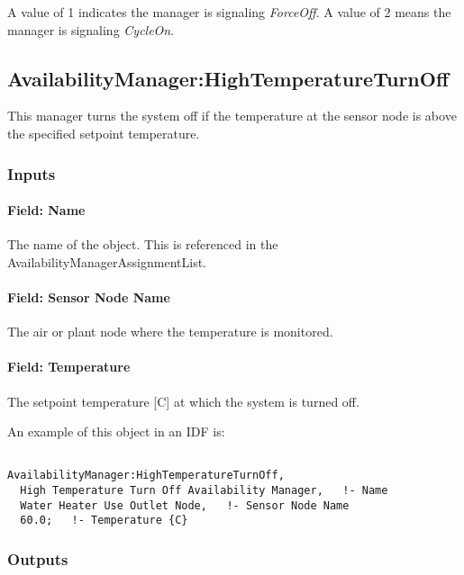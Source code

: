 A value of 1 indicates the manager is signaling \emph{ForceOff}. A value of 2 means the manager is signaling \emph{CycleOn}.

\subsection{AvailabilityManager:HighTemperatureTurnOff}\label{availabilitymanagerhightemperatureturnoff}

This manager turns the system off if the temperature at the sensor node is above the specified setpoint temperature.

\subsubsection{Inputs}\label{inputs-5-031}

\paragraph{Field: Name}\label{field-name-4-029}

The name of the object. This is referenced in the AvailabilityManagerAssignmentList.

\paragraph{Field: Sensor Node Name}\label{field-sensor-node-name-002}

The air or plant node where the temperature is monitored.

\paragraph{Field: Temperature}\label{field-temperature}

The setpoint temperature {[}C{]} at which the system is turned off.

An example of this object in an IDF is:

\begin{lstlisting}

AvailabilityManager:HighTemperatureTurnOff,
  High Temperature Turn Off Availability Manager,   !- Name
  Water Heater Use Outlet Node,   !- Sensor Node Name
  60.0;   !- Temperature {C}
\end{lstlisting}

\subsubsection{Outputs}\label{outputs-4-017}

